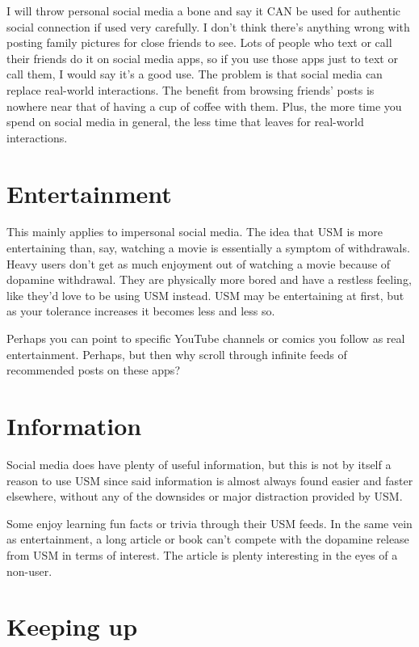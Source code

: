 \documentclass[
  openany]{book}
\begin{document}
I will throw personal social media a bone and say it CAN be used for authentic social connection if used very carefully. I don't think there's anything wrong with posting family pictures for close friends to see. Lots of people who text or call their friends do it on social media apps, so if you use those apps just to text or call them, I would say it's a good use. The problem is that social media can replace real-world interactions. The benefit from browsing friends' posts is nowhere near that of having a cup of coffee with them. Plus, the more time you spend on social media in general, the less time that leaves for real-world interactions.

\section{Entertainment}\label{entertainment}

This mainly applies to impersonal social media. The idea that USM is more entertaining than, say, watching a movie is essentially a symptom of withdrawals. Heavy users don't get as much enjoyment out of watching a movie because of dopamine withdrawal. They are physically more bored and have a restless feeling, like they'd love to be using USM instead. USM may be entertaining at first, but as your tolerance increases it becomes less and less so.

Perhaps you can point to specific YouTube channels or comics you follow as real entertainment. Perhaps, but then why scroll through infinite feeds of recommended posts on these apps?

\section{Information}\label{information}

Social media does have plenty of useful information, but this is not by itself a reason to use USM since said information is almost always found easier and faster elsewhere, without any of the downsides or major distraction provided by USM.

Some enjoy learning fun facts or trivia through their USM feeds. In the same vein as entertainment, a long article or book can't compete with the dopamine release from USM in terms of interest. The article is plenty interesting in the eyes of a non-user.

\section{Keeping up}\label{keeping-up}
\end{document}
